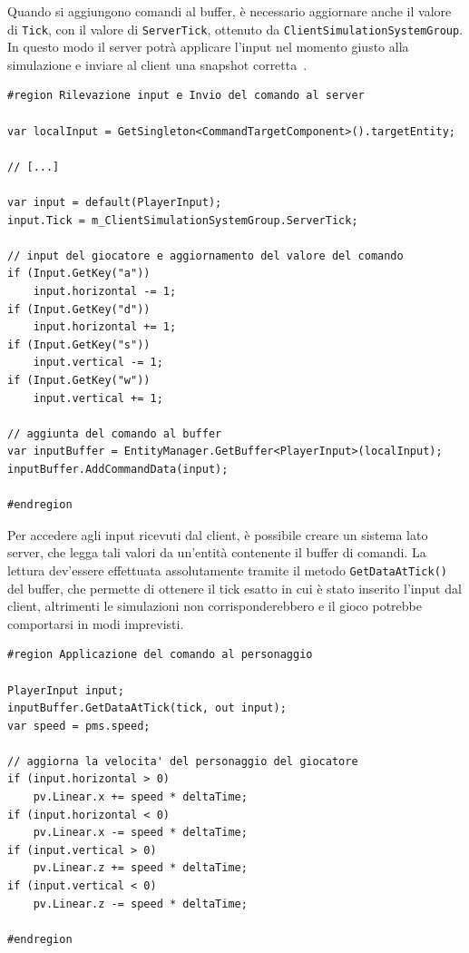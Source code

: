 Quando si aggiungono comandi al buffer, è necessario aggiornare anche il valore di \verb|Tick|, con il valore di \verb|ServerTick|, ottenuto da \verb|ClientSimulationSystemGroup|. In questo modo il server potrà applicare l'input nel momento giusto alla simulazione e inviare
al client una snapshot corretta~\cite{doc:unity-netcode-manual}.

\begin{lstlisting}[caption={Prototipo(client): parte del sistema che campiona gli input del giocatore e li invia al server sotto forma di comandi.}, label={lst:example-command-input},language={[Sharp]C}]
#region Rilevazione input e Invio del comando al server

var localInput = GetSingleton<CommandTargetComponent>().targetEntity;

// [...]

var input = default(PlayerInput);
input.Tick = m_ClientSimulationSystemGroup.ServerTick;

// input del giocatore e aggiornamento del valore del comando
if (Input.GetKey("a"))
    input.horizontal -= 1;
if (Input.GetKey("d"))
    input.horizontal += 1;
if (Input.GetKey("s"))
    input.vertical -= 1;
if (Input.GetKey("w"))
    input.vertical += 1;

// aggiunta del comando al buffer
var inputBuffer = EntityManager.GetBuffer<PlayerInput>(localInput);
inputBuffer.AddCommandData(input);

#endregion
\end{lstlisting}

Per accedere agli input ricevuti dal client, è possibile creare un sistema lato server, che legga tali valori da un'entità contenente il buffer di comandi. La lettura dev'essere effettuata assolutamente tramite il metodo \verb|GetDataAtTick()| del buffer, che permette di ottenere il tick esatto in cui è stato inserito l'input dal client, altrimenti le simulazioni non corrisponderebbero e il gioco potrebbe comportarsi in modi imprevisti.

\begin{lstlisting}[caption={Prototipo(server): parte della lambda expression che aggiorna la velocità del personaggio del giocatore, all'interno del sistema che riceve i comandi.}, label={lst:example-command-output},language={[Sharp]C}]
#region Applicazione del comando al personaggio

PlayerInput input;
inputBuffer.GetDataAtTick(tick, out input);
var speed = pms.speed;

// aggiorna la velocita' del personaggio del giocatore
if (input.horizontal > 0)
    pv.Linear.x += speed * deltaTime;
if (input.horizontal < 0)
    pv.Linear.x -= speed * deltaTime;
if (input.vertical > 0)
    pv.Linear.z += speed * deltaTime;
if (input.vertical < 0)
    pv.Linear.z -= speed * deltaTime;
    
#endregion
\end{lstlisting}

